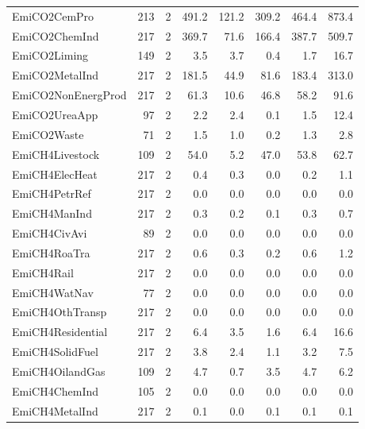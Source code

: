 {\begin{tabular}[t]{lrrrrrrr}
EmiCO2CemPro & 213 & 2 & \num{491.2} & \num{121.2} & \num{309.2} & \num{464.4} & \num{873.4}\\
EmiCO2ChemInd & 217 & 2 & \num{369.7} & \num{71.6} & \num{166.4} & \num{387.7} & \num{509.7}\\
EmiCO2Liming & 149 & 2 & \num{3.5} & \num{3.7} & \num{0.4} & \num{1.7} & \num{16.7}\\
EmiCO2MetalInd & 217 & 2 & \num{181.5} & \num{44.9} & \num{81.6} & \num{183.4} & \num{313.0}\\
EmiCO2NonEnergProd & 217 & 2 & \num{61.3} & \num{10.6} & \num{46.8} & \num{58.2} & \num{91.6}\\
EmiCO2UreaApp & 97 & 2 & \num{2.2} & \num{2.4} & \num{0.1} & \num{1.5} & \num{12.4}\\
EmiCO2Waste & 71 & 2 & \num{1.5} & \num{1.0} & \num{0.2} & \num{1.3} & \num{2.8}\\
EmiCH4Livestock & 109 & 2 & \num{54.0} & \num{5.2} & \num{47.0} & \num{53.8} & \num{62.7}\\
EmiCH4ElecHeat & 217 & 2 & \num{0.4} & \num{0.3} & \num{0.0} & \num{0.2} & \num{1.1}\\
EmiCH4PetrRef & 217 & 2 & \num{0.0} & \num{0.0} & \num{0.0} & \num{0.0} & \num{0.0}\\
EmiCH4ManInd & 217 & 2 & \num{0.3} & \num{0.2} & \num{0.1} & \num{0.3} & \num{0.7}\\
EmiCH4CivAvi & 89 & 2 & \num{0.0} & \num{0.0} & \num{0.0} & \num{0.0} & \num{0.0}\\
EmiCH4RoaTra & 217 & 2 & \num{0.6} & \num{0.3} & \num{0.2} & \num{0.6} & \num{1.2}\\
EmiCH4Rail & 217 & 2 & \num{0.0} & \num{0.0} & \num{0.0} & \num{0.0} & \num{0.0}\\
EmiCH4WatNav & 77 & 2 & \num{0.0} & \num{0.0} & \num{0.0} & \num{0.0} & \num{0.0}\\
EmiCH4OthTransp & 217 & 2 & \num{0.0} & \num{0.0} & \num{0.0} & \num{0.0} & \num{0.0}\\
EmiCH4Residential & 217 & 2 & \num{6.4} & \num{3.5} & \num{1.6} & \num{6.4} & \num{16.6}\\
EmiCH4SolidFuel & 217 & 2 & \num{3.8} & \num{2.4} & \num{1.1} & \num{3.2} & \num{7.5}\\
EmiCH4OilandGas & 109 & 2 & \num{4.7} & \num{0.7} & \num{3.5} & \num{4.7} & \num{6.2}\\
EmiCH4ChemInd & 105 & 2 & \num{0.0} & \num{0.0} & \num{0.0} & \num{0.0} & \num{0.0}\\
EmiCH4MetalInd & 217 & 2 & \num{0.1} & \num{0.0} & \num{0.1} & \num{0.1} & \num{0.1}\\

\end{tabular}}
